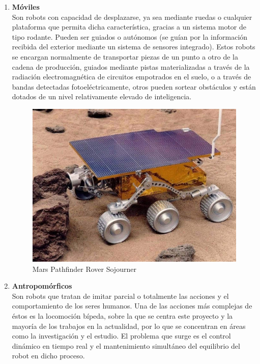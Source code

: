 \begin{enumerate}
\item \textbf{Móviles}\\ Son robots con capacidad de desplazarse, ya sea mediante ruedas o cualquier plataforma que permita dicha característica, gracias a un sistema motor de tipo rodante. Pueden ser guiados o autónomos (se guían por la información recibida del exterior mediante un sistema de sensores integrado). Estos robots se encargan normalmente de transportar piezas de un punto a otro de la cadena de producción, guiados mediante pistas materializadas a través de la radiación electromagnética de circuitos empotrados en el suelo, o a través de bandas detectadas fotoeléctricamente, otros pueden sortear obstáculos y están dotados de un nivel relativamente elevado de inteligencia.

\begin{figure}[H]
\centering
\includegraphics[scale=0.15]{imagenes/apartado_2/22_movil2}
\caption{Mars Pathfinder Rover Sojourner \cite{ref29}}
\label{figura22}
\end{figure}

\item \textbf{Antropomórficos}\\ Son robots que tratan de imitar parcial o totalmente las acciones y el comportamiento de los seres humanos. Una de las acciones más complejas de éstos es la locomoción bípeda, sobre la que se centra este proyecto y la mayoría de los trabajos en la actualidad, por lo que se concentran en áreas como la investigación y el estudio. El problema que surge es el control dinámico en tiempo real y el mantenimiento simultáneo del equilibrio del robot en dicho proceso.


\end{enumerate}
